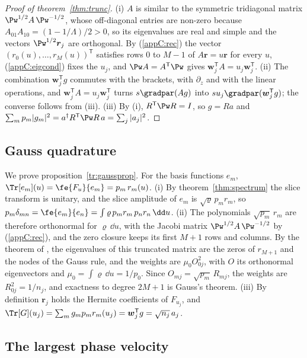 \begin{proof}[Proof of theorem~\ref{thm:trunc}]
(i) $A$ is similar to the symmetric tridiagonal matrix $\Pw^{1/2}A\,\Pw^{-1/2}$, whose off-diagonal entries are non-zero because $A_{01}A_{10}=(1-1/\Lambda)/2>0$, so its eigenvalues are real and simple and the vectors $\Pw^{1/2}\boldsymbol r_j$ are orthogonal. By (\ref{appC:rec}) the vector $(r_0(u),\dots,r_M(u))^{\mathsf T}$ satisfies rows $0$ to $M-1$ of $A\boldsymbol r=u\boldsymbol r$ for every $u$, (\ref{appC:eigcond}) fixes the $u_j$, and $\Pw A=A^{\mathsf T}\Pw$ gives $\boldsymbol w_j^{\mathsf T}A=u_j\boldsymbol w_j^{\mathsf T}$. (ii) The combination $\boldsymbol w_j^{\mathsf T}g$ commutes with the brackets, with $\partial_z$ and with the linear operations, and $\boldsymbol w_j^{\mathsf T}A=u_j\boldsymbol w_j^{\mathsf T}$ turns $s\gradpar(Ag)$ into $su_j\gradpar(\boldsymbol w_j^{\mathsf T}g)$; the converse follows from (iii). (iii) By (i), $R^{\mathsf T}\Pw R=I$, so $g=Ra$ and $\sum_mp_m|g_m|^2=a^\dagger R^{\mathsf T}\Pw R\,a=\sum_j|a_j|^2$.
\end{proof}

\subsection{Gauss quadrature}

We prove proposition~\ref{tr:gaussprop}. For the basis functions $e_m$, $\Tr[e_m](u)=\fe{F_u}{e_m}=p_m\,r_m(u)$. (i) By theorem~\ref{thm:spectrum} the slice transform is unitary, and the slice amplitude of $e_m$ is $\sqrt\varrho\,p_mr_m$, so $p_m\delta_{mn}=\fe{e_m}{e_n}=\int\varrho\,p_mr_m\,p_nr_n\,\dd u$. (ii) The polynomials $\sqrt{p_m}\,r_m$ are therefore orthonormal for $\varrho\,\dd u$, with the Jacobi matrix $\Pw^{1/2}A\,\Pw^{-1/2}$ by (\ref{appC:rec}), and the zero closure keeps its first $M+1$ rows and columns. By the theorem of \citet{GolubWelsch1969}, the eigenvalues of this truncated matrix are the zeros of $r_{M+1}$ and the nodes of the Gauss rule, and the weights are $\mu_0O_{0j}^2$, with $O$ its orthonormal eigenvectors and $\mu_0=\int\varrho\,\dd u=1/p_0$. Since $O_{mj}=\sqrt{p_m}\,R_{mj}$, the weights are $R_{0j}^2=1/n_j$, and exactness to degree $2M+1$ is Gauss's theorem. (iii) By definition $\boldsymbol r_j$ holds the Hermite coefficients of $F_{u_j}$, and $\Tr[G](u_j)=\sum_mg_mp_mr_m(u_j)=\boldsymbol w_j^{\mathsf T}g=\sqrt{n_j}\,a_j$.

\subsection{The largest phase velocity}

